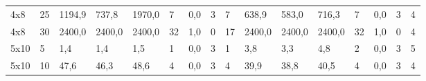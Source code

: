 \begin{table}[]
\begin{tabular}{llllllllllllllll}
		4x8     & 25     & 1194,9                                              & 737,8                                               & 1970,0                                              & 7                                                   & 0,0                                                 & 3      & 7                                                         & 638,9                                               & 583,0                                               & 716,3                                               & 7                                                   & 0,0                                                 & 3      & 4                                                         \\
		4x8     & 30     & 2400,0                                              & 2400,0                                              & 2400,0                                              & 32                                                  & 1,0                                                 & 0      & 17                                                        & 2400,0                                              & 2400,0                                              & 2400,0                                              & 32                                                  & 1,0                                                 & 0      & 4                                                         \\
		5x10    & 5      & 1,4                                                 & 1,4                                                 & 1,5                                                 & 1                                                   & 0,0                                                 & 3      & 1                                                         & 3,8                                                 & 3,3                                                 & 4,8                                                 & 2                                                   & 0,0                                                 & 3      & 5                                                         \\
		5x10    & 10     & 47,6                                                & 46,3                                                & 48,6                                                & 4                                                   & 0,0                                                 & 3      & 4                                                         & 39,9                                                & 38,8                                                & 40,5                                                & 4                                                   & 0,0                                                 & 3      & 4                                                         \\

\end{tabular}
\end{table}
